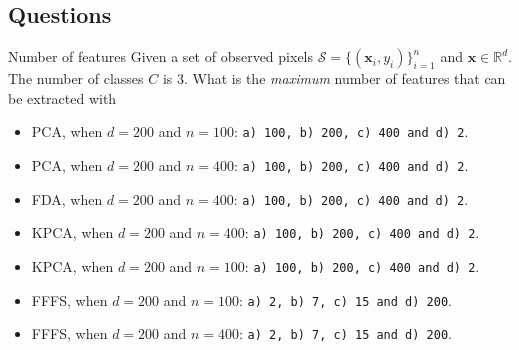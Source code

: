 \documentclass[10pt,aspectratio=1610]{beamer}
\begin{document}
\subsection{Questions}
\label{sec:org9b4a07c}
\begin{frame}[fragile,label={sec:org1ab2d4c}]{Number of features}
 Given         a         set         of         observed         pixels
\(\mathcal{S}=\{(\mathbf{x}_i,y_i)\}_{i=1}^n\)                       and
\(\mathbf{x}\in\mathbb{R}^{d}\). The number of classes \(C\) is \(3\).  What
is the \emph{maximum} number of features that can be extracted with

\begin{itemize}
\item <1> PCA, when \(d=200\) and \(n=100\):  \texttt{a) 100, b) 200, c) 400 and d) 2}.
\item <2> PCA, when \(d=200\) and \(n=400\): \texttt{a) 100, b) 200, c) 400 and d) 2}.
\item <3> FDA, when \(d=200\) and \(n=400\):  \texttt{a) 100, b) 200, c) 400 and d) 2}.
\item <4> KPCA, when \(d=200\) and \(n=400\):  \texttt{a) 100, b) 200, c) 400 and d) 2}.
\item <5> KPCA, when \(d=200\) and \(n=100\):  \texttt{a) 100, b) 200, c) 400 and d) 2}.
\item <6> FFFS, when \(d=200\) and \(n=100\):  \texttt{a) 2, b) 7, c) 15 and d) 200}.
\item <7> FFFS, when \(d=200\) and \(n=400\):  \texttt{a) 2, b) 7, c) 15 and d) 200}.
\end{itemize}
\end{frame}
\end{document}
